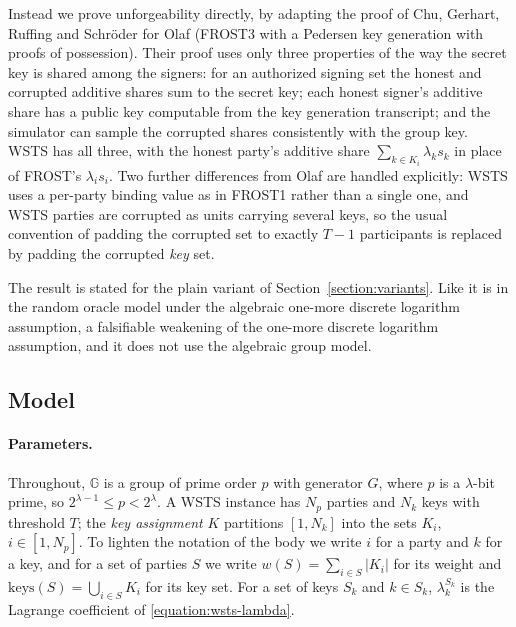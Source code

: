 \documentclass{article}
\theoremstyle{plain}
\theoremstyle{definition}
\theoremstyle{remark}
\begin{document}
Instead we prove unforgeability directly, by adapting the proof of Chu, Gerhart, Ruffing and Schr\"oder \cite{cgrs23} for Olaf (FROST3 with a Pedersen key generation with proofs of possession).  Their proof uses only three properties of the way the secret key is shared among the signers: for an authorized signing set the honest and corrupted additive shares sum to the secret key; each honest signer's additive share has a public key computable from the key generation transcript; and the simulator can sample the corrupted shares consistently with the group key.  WSTS has all three, with the honest party's additive share $\sum_{k \in K_i} \lambda_k s_k$ in place of FROST's $\lambda_i s_i$.  Two further differences from Olaf are handled explicitly: WSTS uses a per-party binding value as in FROST1 \cite{btz22} rather than a single one, and WSTS parties are corrupted as units carrying several keys, so the usual convention of padding the corrupted set to exactly $T-1$ participants is replaced by padding the corrupted \emph{key} set.

The result is stated for the plain variant of Section~\ref{section:variants}.  Like \cite{cgrs23} it is in the random oracle model under the algebraic one-more discrete logarithm assumption, a falsifiable weakening of the one-more discrete logarithm assumption, and it does not use the algebraic group model.

\subsection{
  Model
}\label{section:model}

\paragraph{Parameters.}  Throughout, $\mathbb{G}$ is a group of prime order $p$ with generator $G$, where $p$ is a $\lambda$-bit prime, so $2^{\lambda-1} \le p < 2^{\lambda}$.  A WSTS instance has $N_p$ parties and $N_k$ keys with threshold $T$; the \emph{key assignment} $K$ partitions $[1, N_k]$ into the sets $K_i$, $i \in [1, N_p]$.  To lighten the notation of the body we write $i$ for a party and $k$ for a key, and for a set of parties $S$ we write $w(S) = \sum_{i \in S} |K_i|$ for its weight and $\mathrm{keys}(S) = \bigcup_{i \in S} K_i$ for its key set.  For a set of keys $S_k$ and $k \in S_k$, $\lambda_k^{S_k}$ is the Lagrange coefficient of \eqref{equation:wsts-lambda}.
\end{document}
